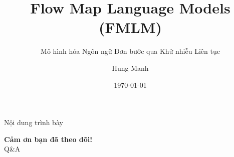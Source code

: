 \documentclass[aspectratio=169]{beamer}
\title[Flow Map Language Models]{Flow Map Language Models (FMLM)}
\subtitle{Mô hình hóa Ngôn ngữ Đơn bước qua Khử nhiễu Liên tục}
\author{Hung Manh}
\date{\today}
\begin{document}
\begin{frame}
    \titlepage
\end{frame}

\begin{frame}{Nội dung trình bày}
    \tableofcontents
\end{frame}



\begin{frame}
    \centering
    \Huge \textbf{Cảm ơn bạn đã theo dõi!}\\
    \vspace{0.5cm}
    \Large Q\&A
\end{frame}
\end{document}
